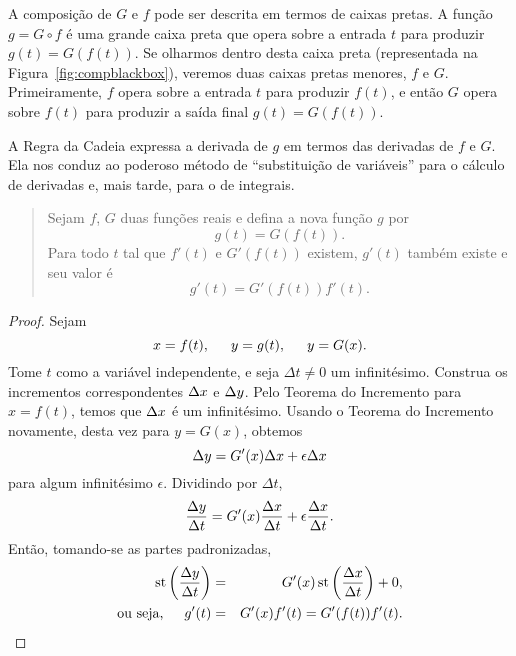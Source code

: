 A composição de $G$ e $f$ pode ser descrita em termos de caixas pretas. A
função $g = G \circ f$ é uma grande caixa preta que opera sobre a entrada
$t$ para produzir $g(t) = G(f(t))$. Se olharmos dentro desta caixa preta
(representada na Figura~\ref{fig:compblackbox}), veremos duas caixas pretas
menores, $f$ e $G$. Primeiramente, $f$ opera sobre a entrada $t$ para
produzir $f(t)$, e então $G$ opera sobre $f(t)$ para produzir a saída final
$g(t) = G(f(t))$.


A Regra da Cadeia expressa a derivada de $g$ em termos das derivadas de $f$
e $G$. Ela nos conduz ao poderoso método de ``substituição de variáveis''
para o cálculo de derivadas e, mais tarde, para o de integrais.


\begin{quote}
  Sejam $f$, $G$ duas funções reais e defina a nova função $g$ por
  $$
    g(t) = G(f(t)).
  $$
  Para todo $t$ tal que $f'(t)$ e $G'(f(t))$ existem, $g'(t)$ também
  existe e seu valor é
  $$
    g'(t) = G'(f(t))f'(t).
  $$
\end{quote}

\begin{proof} Sejam
$$
  x = f(t), \hspace{1.5em} y = g(t), \hspace{1.5em} y = G(x).
$$
Tome $t$ como a variável independente, e seja $\Delta t \ne 0$ um
infinitésimo. Construa os incrementos correspondentes $\Delta x$ e $\Delta y$.
Pelo Teorema do Incremento para $x = f(t)$, temos que $\Delta x$ é um
infinitésimo. Usando o Teorema do Incremento novamente, desta vez
para $y = G(x)$, obtemos
$$
  \Delta y = G'(x) \Delta x + \epsilon \Delta x
$$
para algum infinitésimo $\epsilon$. Dividindo por $\Delta t$,
$$
  \frac{\Delta y}{\Delta t} = G'(x) \frac{\Delta x}{\Delta t} +
                         \epsilon \frac{\Delta x}{\Delta t}.
$$
Então, tomando-se as partes padronizadas,
\begin{eqnarray*}
  \operatorname{st}\left(\frac{\Delta y}{\Delta t}\right) & = & G'(x) \operatorname{st}\left(\frac{\Delta x}{\Delta t}\right) + 0, \\
  \text{ou seja,} \hspace{1.5em} g'(t) & = & G'(x)f'(t) =
                                             G'(f(t)) f'(t).
\end{eqnarray*}
\end{proof}

